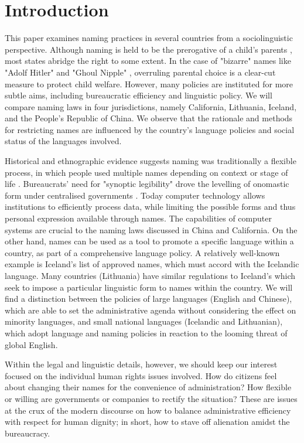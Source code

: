 \section{Introduction}

This paper examines naming practices in several countries from a sociolinguistic
perspective. Although naming is held to be the prerogative of a child's parents
\parencite{alford87}, most states abridge the right to some extent. In the case
of "bizarre" names like "Adolf Hitler" and "Ghoul Nipple" \parencite{larson11},
overruling parental choice is a clear-cut measure to protect child welfare.
However, many policies are instituted for more subtle aims, including
bureaucratic efficiency and linguistic policy. We will compare naming laws in
four jurisdictions, namely California, Lithuania, Iceland, and the People's
Republic of China. We observe that the rationale and methods for restricting
names are influenced by the country's language policies and social status of
the languages involved.

Historical and ethnographic evidence suggests naming was traditionally a
flexible process, in which people used multiple names depending on context or
stage of life \parencite{alford87} \parencite{scott02}. Bureaucrats' need for
"synoptic legibility" drove the levelling of onomastic form under centralised
governments \parencite{scott02}. Today computer technology allows institutions
to efficiently process data, while limiting the possible forms and thus personal
expression available through names. The capabilities of computer systems are
crucial to the naming laws discussed in China and California. On the other hand,
names can be used as a tool to promote a specific language within a country, as
part of a comprehensive language policy. A relatively well-known example is
Iceland's list of approved names, which must accord with the Icelandic language.
Many countries (Lithuania) have similar regulations to Iceland's which seek to
impose a particular linguistic form to names within the country. We will find a
distinction between the policies of large languages (English and Chinese), which
are able to set the administrative agenda without considering the effect on
minority languages, and small national languages (Icelandic and Lithuanian),
which adopt language and naming policies in reaction to the looming threat of
global English.

Within the legal and linguistic details, however, we should keep our
interest focused on the individual human rights issues involved. How do citizens
feel about changing their names for the convenience of administration? How
flexible or willing are governments or companies to rectify the situation? These
are issues at the crux of the modern discourse on how to balance administrative
efficiency with respect for human dignity; in short, how to stave off alienation
amidst the bureaucracy.


